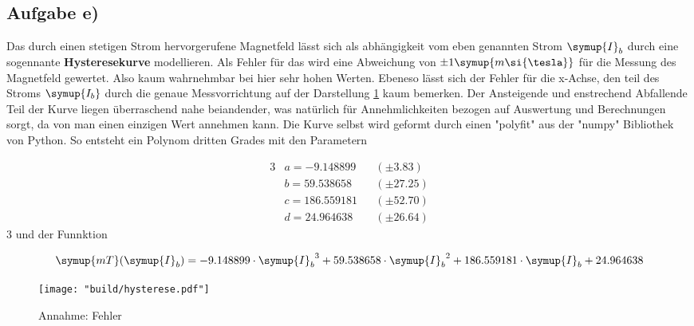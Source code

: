 \subsection{Aufgabe e)}
\label{sec:auswertung_hyst}

 
 Das durch einen stetigen Strom hervorgerufene Magnetfeld lässt sich als abhängigkeit vom eben genannten Strom $\symup{I}_b$ durch eine sogennante \textbf{Hysteresekurve} modellieren.
 Als Fehler für das wird eine Abweichung von $\pm 1 \symup{m\si{\tesla}}$ für die Messung des Magnetfeld gewertet. Also kaum wahrnehmbar bei hier sehr hohen Werten. Ebeneso lässt sich der Fehler für die x-Achse, den teil des Stroms 
 $\symup{I_b}$ durch die genaue Messvorrichtung auf der Darstellung \ref{fig:Bfeld} kaum bemerken.
 Der Ansteigende und enstrechend Abfallende Teil der Kurve liegen überraschend nahe beiandender, was natürlich für Annehmlichkeiten bezogen auf Auswertung und Berechnungen sorgt, da von man einen einzigen Wert annehmen kann.
 Die Kurve selbst wird geformt durch einen "polyfit" aus der "numpy" Bibliothek von Python. So entsteht ein Polynom dritten Grades mit den Parametern 

\begin{alignat*}{3}
&a = -9.148899 &&(\pm 3.83) \\
&b = 59.538658 &&(\pm 27.25) \\
&c = 186.559181 &&(\pm 52.70) \\
&d = 24.964638 &&(\pm 26.64)
\end{alignat*}{3}
und der Funnktion

\begin{equation}
\symup{mT}(\symup{I}_b)=-9.148899 \cdot {\symup{I}_b}^3 + 59.538658 \cdot {\symup{I}_b}^2 + 186.559181 \cdot {\symup{I}_b} + 24.964638
\end{equation}

\begin{figure}
    \centering
    \texttt{[image: "build/hysterese.pdf"]}
    \caption{Annahme: Fehler }
    \label{fig:Bfeld}
 \end{figure}

